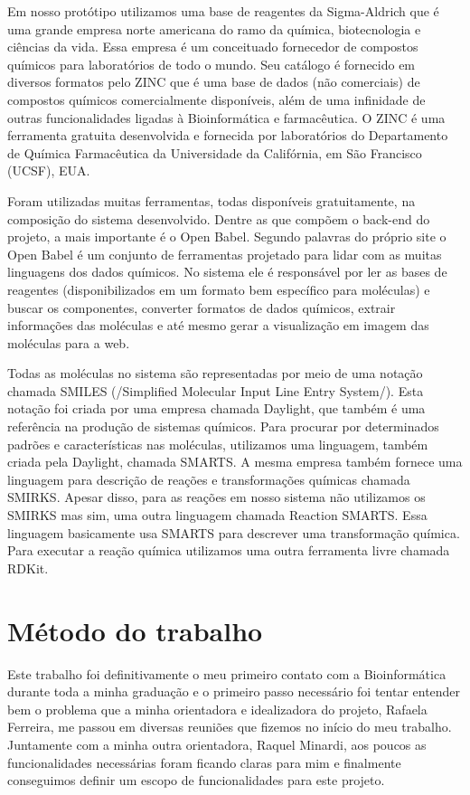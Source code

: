 \documentclass{abnt}
\begin{document}
Em nosso protótipo utilizamos uma base de reagentes da Sigma-Aldrich que é uma grande
empresa norte americana do ramo da química, biotecnologia e ciências da vida. Essa
empresa é um conceituado fornecedor de compostos químicos para laboratórios de todo
o mundo. Seu catálogo é fornecido em diversos formatos pelo ZINC que é uma base de
dados (não comerciais) de compostos químicos comercialmente disponíveis, além de
uma infinidade de outras funcionalidades ligadas à Bioinformática e farmacêutica.
O ZINC é uma ferramenta gratuita desenvolvida e fornecida por laboratórios do Departamento
de Química Farmacêutica da Universidade da Califórnia, em São Francisco (UCSF),
EUA.

Foram utilizadas muitas ferramentas, todas disponíveis gratuitamente, na composição
do sistema desenvolvido. Dentre as que compõem o back-end do projeto, a mais importante
é o Open Babel. Segundo palavras do próprio site o Open Babel é um conjunto de ferramentas
projetado para lidar com as muitas linguagens dos dados químicos. No sistema ele
é responsável por ler as bases de reagentes (disponibilizados em um formato bem
específico para moléculas) e buscar os componentes, converter formatos de dados
químicos, extrair informações das moléculas e até mesmo gerar a visualização em
imagem das moléculas para a web.

Todas as moléculas no sistema são representadas por meio de uma notação chamada
SMILES (/Simplified Molecular Input Line Entry System/). Esta notação foi criada
por uma empresa chamada Daylight, que também é uma referência na produção de sistemas
químicos. Para procurar por determinados padrões e características nas moléculas,
utilizamos uma linguagem, também criada pela Daylight, chamada SMARTS. A mesma empresa
também fornece uma linguagem para descrição de reações e transformações químicas
chamada SMIRKS. Apesar disso, para as reações em nosso sistema não utilizamos os
SMIRKS mas sim, uma outra linguagem chamada Reaction SMARTS. Essa linguagem basicamente
usa SMARTS para descrever uma transformação química. Para executar a reação química
utilizamos uma outra ferramenta livre chamada RDKit.

\chapter{Método do trabalho}

Este trabalho foi definitivamente o meu primeiro contato com a Bioinformática durante
toda a minha graduação e o primeiro passo necessário foi tentar entender bem o problema
que a minha orientadora e idealizadora do projeto, Rafaela Ferreira, me passou em
diversas reuniões que fizemos no início do meu trabalho. Juntamente com a minha
outra orientadora, Raquel Minardi, aos poucos as funcionalidades necessárias foram
ficando claras para mim e finalmente conseguimos definir um escopo de funcionalidades
para este projeto.
\end{document}
